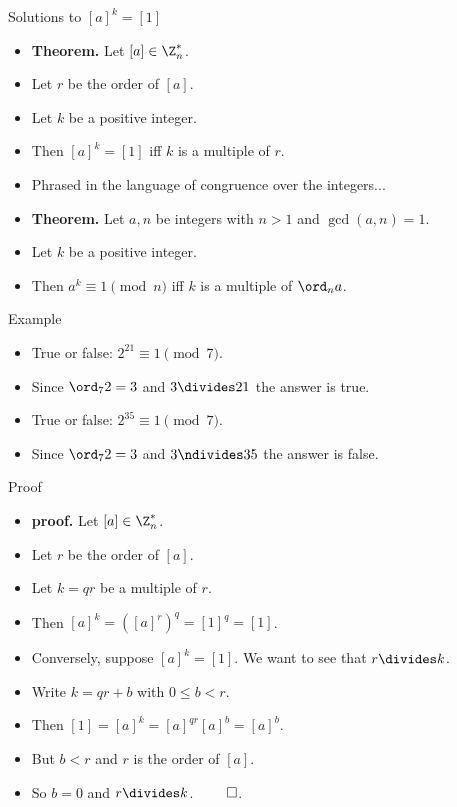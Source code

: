 \documentclass[handout]{beamer}
\begin{document}
\begin{frame}{Solutions to $[a]^k = [1]$}

\begin{itemize}
  \item \textbf{Theorem.} Let $[a]\in\Z^*_n$.
  \item Let $r$ be the order of $[a]$.
  \item Let $k$ be a positive integer.
  \item Then $[a]^k = [1]$ iff $k$ is a multiple of $r$.
  \item Phrased in the language of congruence over the integers...
  \item \textbf{Theorem.} Let $a,n$ be integers with $n>1$ and $\gcd(a,n)=1$.
  \item Let $k$ be a positive integer.
  \item Then $a^k \equiv 1 \pmod n$ iff $k$ is a multiple of $\ord_n a$.
\end{itemize}
\end{frame}

\begin{frame}{Example}

\begin{itemize}
  \item True or false: $2^{21} \equiv 1 \pmod 7$.
  \item Since $\ord_7 2 = 3$ and $3\divides 21$ the answer is true.
  \item True or false: $2^{35} \equiv 1 \pmod 7$.
  \item Since $\ord_7 2 = 3$ and $3\ndivides 35$ the answer is false.
\end{itemize}
\end{frame}

\begin{frame}{Proof}

\begin{itemize}
  \item \textbf{proof.} Let $[a]\in\Z^*_n$.
  \item Let $r$ be the order of $[a]$.
  \item Let $k=qr$ be a multiple of $r$.
  \item Then $[a]^{k} = ([a]^r)^q = [1]^q = [1]$.
  \item Conversely, suppose $[a]^k=[1]$. We want to see that $r\divides k$.
  \item Write $k=qr + b$ with $0\leq b < r$.
  \item Then $[1] = [a]^k = [a]^{qr}[a]^b = [a]^b$.
  \item But $b<r$ and $r$ is the order of $[a]$.
  \item So $b=0$ and $r\divides k$. $\qed$.
\end{itemize}
\end{frame}
\end{document}
